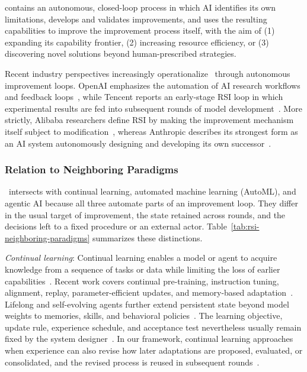 \RSI{} contains an autonomous, closed-loop process in which AI identifies its own limitations, develops and validates improvements, and uses the resulting capabilities to improve the improvement process itself, with the aim of (1) expanding its capability frontier, (2) increasing resource efficiency, or (3) discovering novel solutions beyond human-prescribed strategies.

Recent industry perspectives increasingly operationalize \RSI\ through autonomous improvement loops. OpenAI emphasizes the automation of AI research workflows and feedback loops~\cite{openai2026rsi}, while Tencent reports an early-stage RSI loop in which experimental results are fed into subsequent rounds of model development~\cite{tencent2026hy4}. More strictly, Alibaba researchers define RSI by making the improvement mechanism itself subject to modification~\cite{liu2026path}, whereas Anthropic describes its strongest form as an AI system autonomously designing and developing its own successor~\cite{anthropic2026rsi}.


\subsubsection{Relation to Neighboring Paradigms}
\RSI \ intersects with continual learning, automated machine learning (AutoML), and agentic AI because all three automate parts of an improvement loop. They differ in the usual target of improvement, the state retained across rounds, and the decisions left to a fixed procedure or an external actor. Table~\ref{tab:rsi-neighboring-paradigms} summarizes these distinctions.

\emph{Continual learning}: Continual learning enables a model or agent to acquire knowledge from a sequence of tasks or data while limiting the loss of earlier capabilities~\cite{shi2025continual,wu2024continual,zheng2024lifelongllms}. Recent work covers continual pre-training, instruction tuning, alignment, replay, parameter-efficient updates, and memory-based adaptation~\cite{shi2025continual,wu2024continual}. Lifelong and self-evolving agents further extend persistent state beyond model weights to memories, skills, and behavioral policies~\cite{zheng2026lifelong,fang2025selfevolving}. The learning objective, update rule, experience schedule, and acceptance test nevertheless usually remain fixed by the system designer~\cite{shi2025continual,zheng2024lifelongllms}. In our framework, continual learning approaches \RSI{} when experience can also revise how later adaptations are proposed, evaluated, or consolidated, and the revised process is reused in subsequent rounds~\cite{zheng2026lifelong,fang2025selfevolving}.

